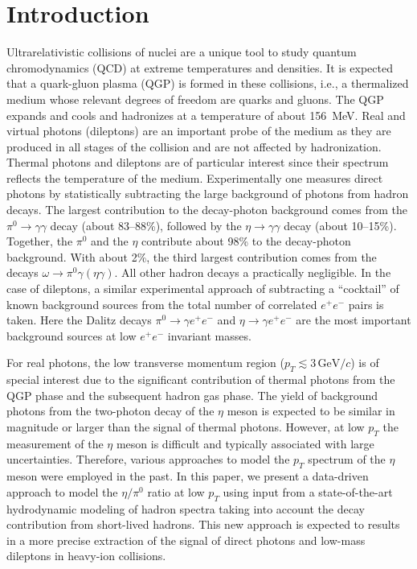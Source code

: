 \documentclass[%
 reprint,
 amsmath,amssymb,
 aps,
prc,
]{revtex4-2}
\begin{document}
\section{Introduction}

Ultrarelativistic collisions of nuclei are a unique tool to study quantum chromodynamics (QCD) at extreme temperatures and densities. It is expected that a quark-gluon plasma (QGP) is formed in these collisions, i.e., a thermalized medium whose relevant degrees of freedom are quarks and gluons. The QGP expands and cools and hadronizes at a temperature of about 156~MeV. Real and virtual photons (dileptons) are an important probe of the medium as they are produced in all stages of the collision and are not affected by hadronization. Thermal photons and dileptons are of particular interest since their spectrum reflects the temperature of the medium. Experimentally one measures direct photons by statistically subtracting the large background of photons from hadron decays. The largest contribution to the decay-photon background comes from the $\pi^0 \to \gamma \gamma$ decay (about 83--88\%), followed by the $\eta \to \gamma \gamma$ decay (about 10--15\%). Together, the $\pi^0$ and the $\eta$ contribute about 98\% to the decay-photon background. With about 2\%, the third largest contribution comes from the decays $\omega \to \pi^0 \gamma (\eta \gamma)$. All other hadron decays a practically negligible. In the case of dileptons, a similar experimental approach of subtracting a ``cocktail'' of known background sources from the total number of correlated $e^+e^-$ pairs is taken. Here the Dalitz decays $\pi^0 \to \gamma e^+e^-$ and $\eta \to \gamma e^+e^-$ are the most important background sources at low $e^+e^-$ invariant masses.

For real photons, the low transverse momentum region ($p_T \lesssim 3\,\mathrm{GeV}/c$) is of special interest due to the significant contribution of thermal photons from the QGP phase and the subsequent hadron gas phase. The yield of background photons from the two-photon decay of the $\eta$ meson is expected to be similar in magnitude or larger than the signal of thermal photons. However, at low $p_T$ the measurement of the $\eta$ meson is difficult and typically associated with large uncertainties. Therefore, various approaches to model the $p_T$ spectrum of the $\eta$ meson were employed in the past. In this paper, we present a data-driven approach to model the $\eta/\pi^0$ ratio at low $p_T$ using input from a state-of-the-art hydrodynamic modeling of hadron spectra taking into account the decay contribution from short-lived hadrons. This new approach is expected to results in a more precise extraction of the signal of direct photons and low-mass dileptons in heavy-ion collisions.
\end{document}
